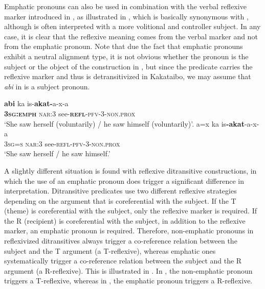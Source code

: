 \documentclass[output=paper,colorlinks,citecolor=brown,modfonts,nonflat]{langscibook}
\begin{document}
Emphatic pronouns can also be used in combination with the verbal reflexive marker introduced in , as illustrated in , which is basically synonymous with , although  is often interpreted with a more volitional and controller subject. In any case, it is clear that the reflexive meaning comes from the verbal marker and not from the emphatic pronoun. Note that due the fact that emphatic pronouns exhibit a neutral alignment type, it is not obvious whether the pronoun is the subject or the object of the construction in , but since the predicate carries the reflexive marker and thus is detransitivized in Kakataibo, we may assume that \textit{abi} in  is a subject pronoun.

\ea%
    \label{ex:zariquiey:13}
    \ea%
    \label{ex:zariquiey:13a}
    \gll    \textbf{abi} ka is-\textbf{akat-}a-x-a\\
            \textbf{\textsc{3sg:emph}}      \textsc{nar:3}  see-\textbf{\textsc{refl}}\textsc{{}-pfv-3-non.prox}\\
    \glt    ‘She saw herself (voluntarily) / he saw himself (voluntarily)’. 
    \ex%
    \label{ex:zariquiey:13b}
    \gll    a=x  ka  is\textbf{-akat}-a-x-a\\
            \textsc{3sg=s}  \textsc{nar:3}  see-\textsc{refl-pfv-3-non.prox}\\
    \glt    ‘She saw herself / he saw himself.’
    \z
\z

A slightly different situation is found with reflexive ditransitive constructions, in which the use of an emphatic pronoun does trigger a significant difference in interpretation. Ditransitive predicates use two different reflexive strategies depending on the argument that is coreferential with the subject. If the T (theme) is coreferential with the subject, only the reflexive marker is required. If the R (recipient) is coreferential with the subject, in addition to the reflexive marker, an emphatic pronoun is required. Therefore, non-emphatic pronouns in reflexivized ditransitives always trigger a co-reference relation between the subject and the T argument (a T-reflexive), whereas emphatic ones systematically trigger a co-reference relation between the subject and the R argument (a R-reflexive). This is illustrated in . In , the non-emphatic pronoun triggers a T-reflexive, whereas in , the emphatic pronoun triggers a R-reflexive.
\end{document}
